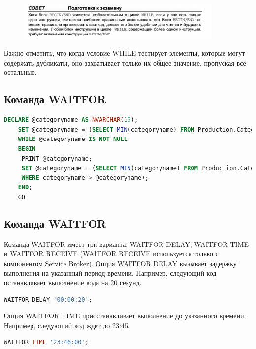 \begin{figure}[h!]
	\begin{center}
		\includegraphics[width=0.9\textwidth]{img/advice37.png}
	\end{center}
	\captionsetup{justification=centering}
\end{figure}

Важно отметить, что когда условие WHILE тестирует элементы, которые могут содержать дубликаты, оно захватывает только их общее значение, пропуская все остальные.


\subsection{Команда WAITFOR}

\begin{lstlisting}[label=lst:funcReturn, language=sql]
	DECLARE @categoryname AS NVARCHAR(15);
	SET @categoryname = (SELECT MIN(categoryname) FROM Production.Categories);
	WHILE @categoryname IS NOT NULL
	BEGIN
	 PRINT @categoryname;
	 SET @categoryname = (SELECT MIN(categoryname) FROM Production.Categories
	 WHERE categoryname > @categoryname);
	END;
	GO
\end{lstlisting}

\subsection{Команда WAITFOR}

Команда WAITFOR имеет
три варианта: WAITFOR DELAY, WAITFOR TIME и WAITFOR RECEIVE (WAITFOR RECEIVE используется только с компонентом Service Broker). 
Опция WAITFOR DELAY вызывает задержку выполнения на указанный период времени. Например, следующий код останавливает выполнение кода на 20 секунд. 

\begin{lstlisting}[label=lst:funcReturn, language=sql]
	WAITFOR DELAY '00:00:20';
\end{lstlisting}

Опция WAITFOR TIME приостанавливает выполнение до указанного времени. Например, следующий код ждет до 23:45. 

\begin{lstlisting}[label=lst:funcReturn, language=sql]
	WAITFOR TIME '23:46:00';
\end{lstlisting}


